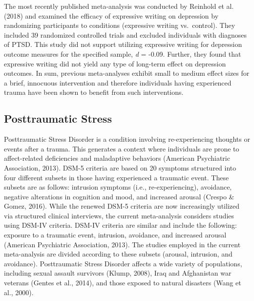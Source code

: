 \documentclass[man]{apa6}
\theoremstyle{definition}
\theoremstyle{definition}
\theoremstyle{definition}
\theoremstyle{remark}
\begin{document}
The most recently published meta-analysis was conducted by Reinhold et
al. (2018) and examined the efficacy of expressive writing on depression
by randomizing participants to conditions (expressive writing
vs.~control). They included 39 randomized controlled trials and excluded
individuals with diagnoses of PTSD. This study did not support utilizing
expressive writing for depression outcome measures for the specified
sample, \emph{d} = -0.09. Further, they found that expressive writing
did not yield any type of long-term effect on depression outcomes. In
sum, previous meta-analyses exhibit small to medium effect sizes for a
brief, innocuous intervention and therefore individuals having
experienced trauma have been shown to benefit from such interventions.

\subsection{Posttraumatic Stress}\label{posttraumatic-stress}

Posttraumatic Stress Disorder is a condition involving re-experiencing
thoughts or events after a trauma. This generates a context where
individuals are prone to affect-related deficiencies and maladaptive
behaviors (American Psychiatric Association, 2013). DSM-5 criteria are
based on 20 symptoms structured into four different subsets in those
having experienced a traumatic event. These subsets are as follows:
intrusion symptoms (i.e., re-experiencing), avoidance, negative
alterations in cognition and mood, and increased arousal (Crespo \&
Gomez, 2016). While the renewed DSM-5 criteria are now increasingly
utilized via structured clinical interviews, the current meta-analysis
considers studies using DSM-IV criteria. DSM-IV criteria are similar and
include the following: exposure to a traumatic event, intrusion,
avoidance, and increased arousal (American Psychiatric Association,
2013). The studies employed in the current meta-analysis are divided
according to these subsets (arousal, intrusion, and avoidance).
Posttraumatic Stress Disorder affects a wide variety of populations,
including sexual assault survivors (Klump, 2008), Iraq and Afghanistan
war veterans (Gentes et al., 2014), and those exposed to natural
disasters (Wang et al., 2000).
\end{document}
